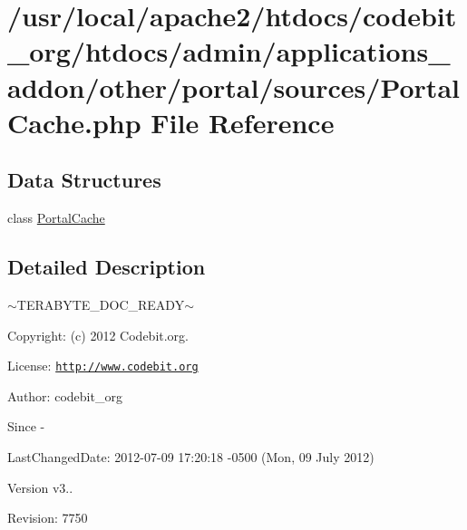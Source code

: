 \hypertarget{_portal_cache_8php}{\section{/usr/local/apache2/htdocs/codebit\-\_\-org/htdocs/admin/applications\-\_\-addon/other/portal/sources/\-Portal\-Cache.php File Reference}
\label{_portal_cache_8php}
}
\subsection*{Data Structures}
\begin{DoxyCompactItemize}
\item 
class \hyperlink{class_portal_cache}{Portal\-Cache}
\end{DoxyCompactItemize}


\subsection{Detailed Description}
$\sim$\-T\-E\-R\-A\-B\-Y\-T\-E\-\_\-\-D\-O\-C\-\_\-\-R\-E\-A\-D\-Y$\sim$ \begin{DoxyParagraph}{Copyright\-:}
(c) 2012 Codebit.\-org.
\end{DoxyParagraph}
\begin{DoxyParagraph}{License\-:}
\href{http://www.codebit.org}{\tt http\-://www.\-codebit.\-org}
\end{DoxyParagraph}
\begin{DoxyParagraph}{Author\-:}
codebit\-\_\-org 
\end{DoxyParagraph}
\begin{DoxySince}{Since}
-\/ 
\end{DoxySince}
\begin{DoxyParagraph}{Last\-Changed\-Date\-:}
2012-\/07-\/09 17\-:20\-:18 -\/0500 (Mon, 09 July 2012) 
\end{DoxyParagraph}
\begin{DoxyVersion}{Version}
v3.. 
\end{DoxyVersion}
\begin{DoxyParagraph}{Revision\-:}
7750 
\end{DoxyParagraph}
